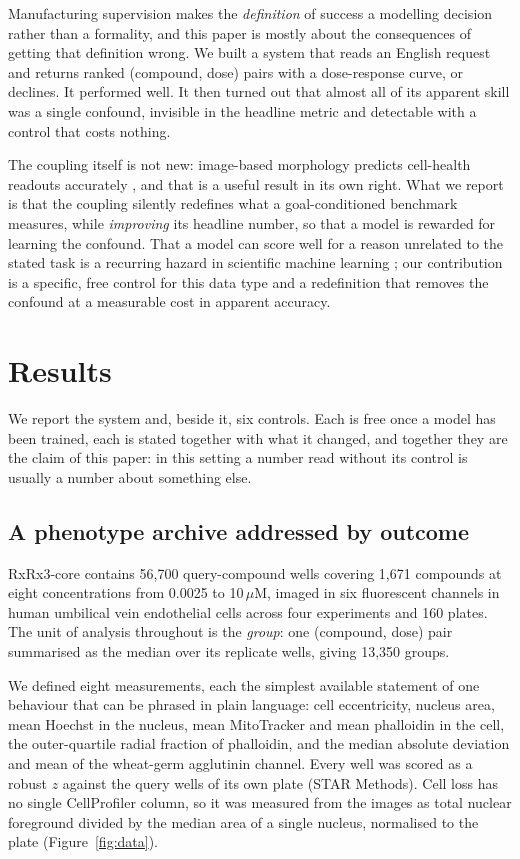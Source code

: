 \documentclass[11pt]{article}
\begin{document}
Manufacturing supervision makes the \emph{definition} of success a modelling decision
rather than a formality, and this paper is mostly about the consequences of getting that
definition wrong. We built a system that reads an English request and returns ranked
(compound, dose) pairs with a dose-response curve, or declines. It performed well. It then
turned out that almost all of its apparent skill was a single confound, invisible in the
headline metric and detectable with a control that costs nothing.

The coupling itself is not new: image-based morphology predicts cell-health readouts
accurately \citep{way2021cellhealth}, and that is a useful result in its own right. What we
report is that the coupling silently redefines what a goal-conditioned benchmark measures,
while \emph{improving} its headline number, so that a model is rewarded for learning the
confound. That a model can score well for a reason unrelated to the stated task is a
recurring hazard in scientific machine learning
\citep{chuang2018adversarial,wallach2018memorization,geirhos2020shortcut}; our contribution
is a specific, free control for this data type and a redefinition that removes the
confound at a measurable cost in apparent accuracy.

\section{Results}

We report the system and, beside it, six controls. Each is free once a model has been
trained, each is stated together with what it changed, and together they are the claim of
this paper: in this setting a number read without its control is usually a number about
something else.

\subsection{A phenotype archive addressed by outcome}

RxRx3-core \citep{kraus2025rxrx3core} contains 56,700 query-compound wells covering 1,671
compounds at eight concentrations from 0.0025 to 10\,$\mu$M, imaged in six fluorescent
channels in human umbilical vein endothelial cells across four experiments and 160 plates.
The unit of analysis throughout is the \emph{group}: one (compound, dose) pair summarised
as the median over its replicate wells, giving 13,350 groups.

We defined eight measurements, each the simplest available statement of one behaviour that
can be phrased in plain language: cell eccentricity, nucleus area, mean Hoechst in the
nucleus, mean MitoTracker and mean phalloidin in the cell, the outer-quartile radial
fraction of phalloidin, and the median absolute deviation and mean of the wheat-germ
agglutinin channel. Every well was scored as a robust $z$ against the query wells of its
own plate (STAR Methods). Cell loss has no single CellProfiler column, so it was measured
from the images as total nuclear foreground divided by the median area of a single nucleus,
normalised to the plate (Figure~\ref{fig:data}).
\end{document}
